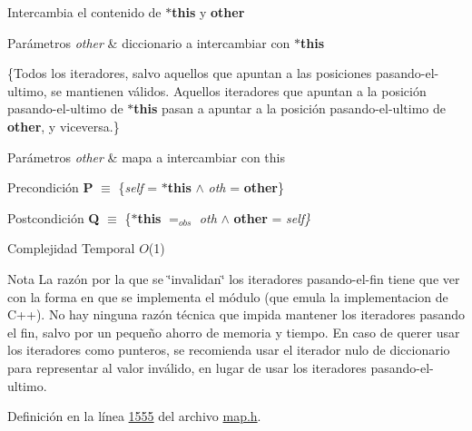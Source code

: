 \-Intercambia el contenido de {\bfseries $\ast$this} y {\bfseries other} 


\begin{DoxyParams}{\-Parámetros}
{\em other} & diccionario a intercambiar con {\bfseries $\ast$this}\\
\hline
\end{DoxyParams}
\{\-Todos los iteradores, salvo aquellos que apuntan a las posiciones pasando-\/el-\/ultimo, se mantienen válidos. \-Aquellos iteradores que apuntan a la posición pasando-\/el-\/ultimo de {\bfseries $\ast$this} pasan a apuntar a la posición pasando-\/el-\/ultimo de {\bfseries other}, y viceversa.\}


\begin{DoxyParams}{\-Parámetros}
{\em other} & mapa a intercambiar con this\\
\hline
\end{DoxyParams}
\begin{DoxyPrecond}{\-Precondición}
{\bfseries \-P} $\equiv$ \{{\itshape self\/} = {\bfseries $\ast$this} $\land$ {\itshape oth\/} = {\bfseries other}\} 
\end{DoxyPrecond}
\begin{DoxyPostcond}{\-Postcondición}
{\bfseries \-Q} $\equiv$ \{{\bfseries $\ast$this} $=_{obs}$ {\itshape oth\/} $\land$ {\bfseries other} = {\itshape self\}\/} 
\end{DoxyPostcond}

\begin{DoxyDescription}
\item[\-Complejidad \-Temporal]$O$(1)
\end{DoxyDescription}

\begin{DoxyNote}{\-Nota}
\-La razón por la que se \char`\"{}invalidan\char`\"{} los iteradores pasando-\/el-\/fin tiene que ver con la forma en que se implementa el módulo (que emula la implementacion de \-C++). \-No hay ninguna razón técnica que impida mantener los iteradores pasando el fin, salvo por un pequeño ahorro de memoria y tiempo. \-En caso de querer usar los iteradores como punteros, se recomienda usar el iterador nulo de diccionario para representar al valor inválido, en lugar de usar los iteradores pasando-\/el-\/ultimo. 
\end{DoxyNote}


\-Definición en la línea \hyperlink{map_8h_source_l01555}{1555} del archivo \hyperlink{map_8h_source}{map.\-h}.

